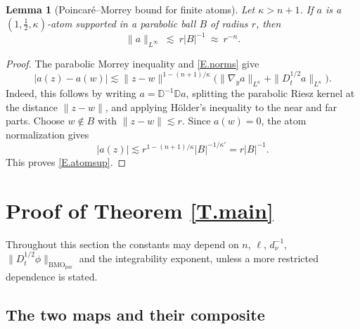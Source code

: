 \documentclass[12pt,leqno]{amsart}
\numberwithin{equation}{section}
\newcommand{\dhalf}{D_t^{1/2}}
\newcommand{\BMOpar}{\mathrm{BMO}_{\mathrm{par}}}
\newcommand{\Dpar}{\mathbb D}
\theoremstyle{plain}
\newtheorem{lemma}[equation]{Lemma}
\theoremstyle{remark}
\begin{document}
\begin{lemma}[Poincar\'e--Morrey bound for finite atoms]\label{L.atomsup}
Let $\kappa>n+1$. If $a$ is a $(1,\tfrac12,\kappa)$-atom supported in a
parabolic ball $B$ of radius $r$, then
\begin{equation}\label{E.atomsup}
 \|a\|_{L^\infty}\ \lesssim\ r|B|^{-1}\ \approx\ r^{-n}.
\end{equation}
\end{lemma}

\begin{proof}
The parabolic Morrey inequality and \eqref{E.norms} give
\[
 |a(z)-a(w)|\lesssim
 \|z-w\|^{1-(n+1)/\kappa}
 \big(\|\nabla_ya\|_{L^\kappa}+\|\dhalf a\|_{L^\kappa}\big).
\]
Indeed, this follows by writing $a=\Dpar^{-1}\Dpar a$, splitting the
parabolic Riesz kernel at the distance $\|z-w\|$, and applying H\"older's
inequality to the near and far parts. Choose $w\notin B$ with
$\|z-w\|\lesssim r$. Since $a(w)=0$, the atom normalization gives
\[
 |a(z)|\lesssim r^{1-(n+1)/\kappa}|B|^{-1/\kappa'}
 =r|B|^{-1}.
\]
This proves \eqref{E.atomsup}.
\end{proof}

\section{Proof of Theorem \ref{T.main}}\label{S.main}

Throughout this section the constants may depend on $n$, $\ell$,
$d_\nu^{-1}$, $\|\dhalf\phi\|_{\BMOpar}$ and the integrability exponent,
unless a more restricted dependence is stated.

\subsection{The two maps and their composite}\label{ss.maps}
\end{document}
